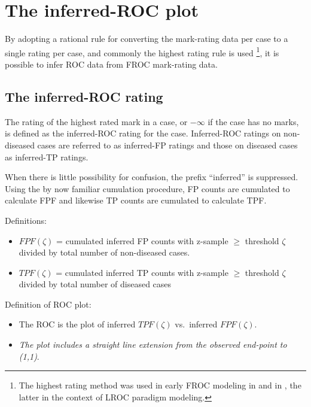 \documentclass[
]{book}
\providecommand{\tightlist}{%
  \setlength{\itemsep}{0pt}\setlength{\parskip}{0pt}}
\begin{document}
\hypertarget{empirical-ROC}{%
\section{The inferred-ROC plot}\label{empirical-ROC}}

By adopting a rational rule for converting the mark-rating data per case to a single rating per case, and commonly the highest rating rule is used \footnote{The highest rating method was used in early FROC modeling in \citep{bunch1977free} and in \citep{swensson1996unified}, the latter in the context of LROC paradigm modeling.}, it is possible to infer ROC data from FROC mark-rating data.

\hypertarget{the-inferred-roc-rating}{%
\subsection{The inferred-ROC rating}\label{the-inferred-roc-rating}}

The rating of the highest rated mark in a case, or \(-\infty\) if the case has no marks, is defined as the inferred-ROC rating for the case. Inferred-ROC ratings on non-diseased cases are referred to as inferred-FP ratings and those on diseased cases as inferred-TP ratings.

When there is little possibility for confusion, the prefix ``inferred'' is suppressed. Using the by now familiar cumulation procedure, FP counts are cumulated to calculate FPF and likewise TP counts are cumulated to calculate TPF.

Definitions:

\begin{itemize}
\tightlist
\item
  \(FPF(\zeta)\) = cumulated inferred FP counts with z-sample \(\geq\) threshold \(\zeta\) divided by total number of non-diseased cases.
\item
  \(TPF(\zeta)\) = cumulated inferred TP counts with z-sample \(\geq\) threshold \(\zeta\) divided by total number of diseased cases
\end{itemize}

Definition of ROC plot:

\begin{itemize}
\tightlist
\item
  The ROC is the plot of inferred \(TPF(\zeta)\) vs.~inferred \(FPF(\zeta)\).
\item
  \emph{The plot includes a straight line extension from the observed end-point to (1,1)}.
\end{itemize}
\end{document}
